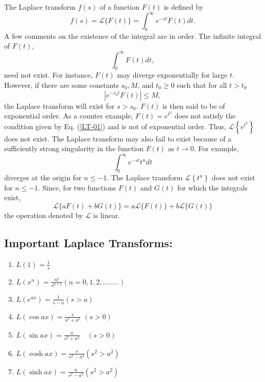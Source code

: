 The Laplace transform $f(s)$ of a function $F(t)$ is defined by 
\begin{equation}
f(s)=\mathcal{L}\{F(t)\}=\int_{0}^{\infty} e^{-s t} F(t) d t .
\end{equation}
A few comments on the existence of the integral are in order. The infinite integral of $F(t)$,
\begin{equation*}
\int_{0}^{\infty} F(t) d t,
\end{equation*}
need not exist. For instance, $F(t)$ may diverge exponentially for large $t$. However, if there are some constants $s_{0}, M$, and $t_{0} \geq 0$ such that for all $t>t_{0}$
\begin{equation}
\left|e^{-s_{0} t} F(t)\right| \leq M,\label{LT-01}
\end{equation}
the Laplace transform will exist for $s>s_{0} $. $F(t)$ is then said to be of exponential order. As a counter example, $F(t)=e^{t^{2}}$ does not satisfy the condition given by Eq. (\ref{LT-01}) and is not of exponential order. Thus, $\mathcal{L}\left\{e^{t^{2}}\right\}$ does not exist.
The Laplace transform may also fail to exist because of a sufficiently strong singularity in the function $F(t)$ as $t \rightarrow 0$. For example,
\begin{equation*}
\int_{0}^{\infty} e^{-s t} t^{n} d t
\end{equation*}
diverges at the origin for $n \leq-1$. The Laplace transform $\mathcal{L}\left\{t^{n}\right\}$ does not exist for $n \leq-1$. Since, for two functions $F(t)$ and $G(t)$ for which the integrals exist,
\begin{equation}
\mathcal{L}\{a F(t)+b G(t)\}=a \mathcal{L}\{F(t)\}+b \mathcal{L}\{G(t)\}
\end{equation}
the operation denoted by $\mathcal{L}$ is linear.\\
\subsection{Important Laplace Transforms:}
\begin{enumerate}
	\item $L(1)=\frac{1}{s}$
	\item $L\left(x^{n}\right)=\frac{n !}{s^{n+1}}(n=0,1,2, \ldots \ldots . .)$
	\item $L\left(e^{a x}\right)=\frac{1}{s-a}(s>a)$
	\item $L(\cos a x)=\frac{s}{s^{2}+a^{2}}$
	$(s>0)$
	\item $L(\sin a x)=\frac{a}{s^{2}+a^{2}} \quad(s>0)$
	\item $L(\cosh a x)=\frac{s}{s^{2}-a^{2}}\left(s^{2}>a^{2}\right)$
	\item $L(\sinh a x)=\frac{a}{s^{2}-a^{2}}\left(s^{2}>a^{2}\right)$
\end{enumerate}

